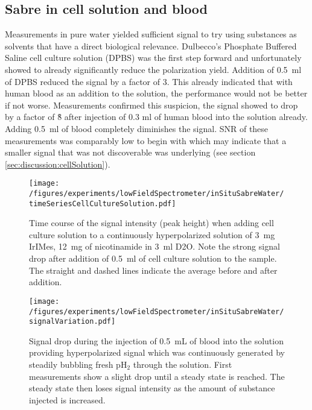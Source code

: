     \subsection{Sabre in cell solution and blood}
    Measurements in pure water yielded sufficient signal to try using substances as solvents that have a direct biological relevance. Dulbecco's Phosphate Buffered Saline cell culture solution (DPBS) was the first step forward and unfortunately showed to already significantly reduce the polarization yield. Addition of \SI{0.5}{\milli\litre} of DPBS reduced the signal by a factor of 3. This already indicated that with human blood as an addition to the solution, the performance would not be better if not worse. Measurements confirmed this suspicion, the signal showed to drop by a factor of \~8 after injection of 0.3 ml of human blood into the solution already. Adding \SI{0.5}{\milli\litre} of blood completely diminishes the signal. SNR of these measurements was comparably low to begin with which may indicate that a smaller signal that was not discoverable was underlying (see section \ref{sec:discussion:cellSolution}).
        \begin{figure}
            \texttt{[image: /figures/experiments/lowFieldSpectrometer/inSituSabreWater/timeSeriesCellCultureSolution.pdf]}
            \caption[Cell culture solution addition to hyperpolarized signal]{Time course of the signal intensity (peak height) when adding cell culture solution to a continuously hyperpolarized solution of \SI{3}{\milli\gram} IrIMes, \SI{12}{\milli\gram} of nicotinamide in \SI{3}{\milli\litre} D2O. Note the strong signal drop after addition of \SI{0.5}{\milli\litre} of cell culture solution to the sample. The straight and dashed lines indicate the average before and after addition.}
            \label{chap:MaterialsAndMethods:bloodInjection}
        \end{figure}
        \begin{figure}
            \centering
            \texttt{[image: /figures/experiments/lowFieldSpectrometer/inSituSabreWater/signalVariation.pdf]}
            \caption[Blood addition to hyperpolarized signal]{Signal drop during the injection of \SI{0.5}{\milli\liter} of blood into the solution providing hyperpolarized signal which was continuously generated by steadily bubbling fresh pH$_2$ through the solution. First measurements show a slight drop until a steady state is reached. The steady state then loses signal intensity as the amount of substance injected is increased.}
            \label{chap:MaterialsAndMethods:bloodInjection2}
        \end{figure}
